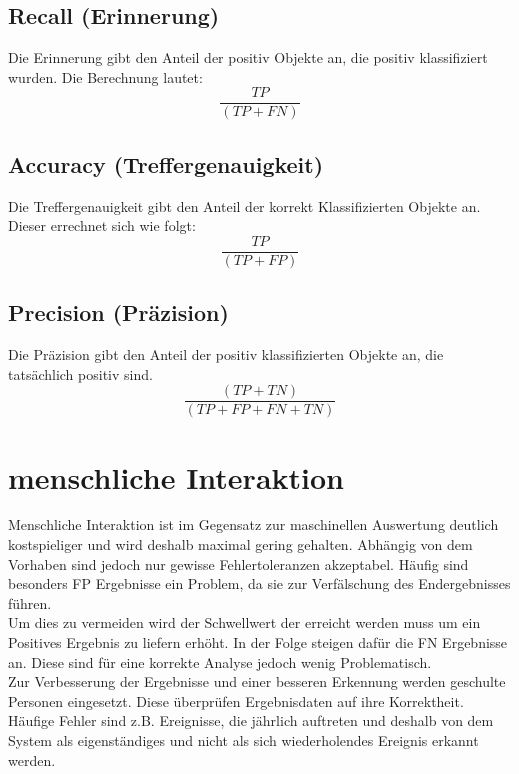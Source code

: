 \documentclass[twoside,a4paper]{article}
\begin{document}
\subsection{Recall (Erinnerung)}
Die Erinnerung gibt den Anteil der positiv Objekte an, die positiv klassifiziert wurden. Die Berechnung lautet:
$$\frac{TP}{(TP+FN)}$$

\subsection{Accuracy (Treffergenauigkeit)}
Die Treffergenauigkeit gibt den Anteil der korrekt Klassifizierten Objekte an. Dieser errechnet sich wie folgt:
$$\frac{TP}{(TP+FP)}$$

\subsection{Precision (Präzision)}
Die Präzision gibt den Anteil der positiv klassifizierten Objekte an, die tatsächlich positiv sind.
$$\frac{(TP+TN)}{(TP+FP+FN+TN)}$$

\section{menschliche Interaktion}
Menschliche Interaktion ist im Gegensatz zur maschinellen Auswertung deutlich kostspieliger und wird deshalb maximal gering gehalten. Abhängig von dem Vorhaben sind jedoch nur gewisse Fehlertoleranzen akzeptabel. Häufig sind besonders FP Ergebnisse ein Problem, da sie zur Verfälschung des Endergebnisses führen.\\
Um dies zu vermeiden wird der Schwellwert der erreicht werden muss um ein Positives Ergebnis zu liefern erhöht. In der Folge steigen dafür die FN Ergebnisse an. Diese sind für eine korrekte Analyse jedoch wenig Problematisch.\\
Zur Verbesserung der Ergebnisse und einer besseren Erkennung werden geschulte Personen eingesetzt. Diese überprüfen Ergebnisdaten auf ihre Korrektheit. Häufige Fehler sind z.B. Ereignisse, die jährlich auftreten und deshalb von dem System als eigenständiges und nicht als sich wiederholendes Ereignis erkannt werden.
\end{document}
